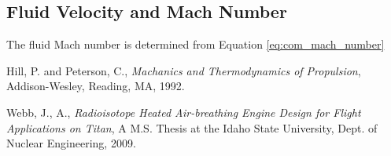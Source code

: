 \subsection{Fluid Velocity and Mach Number}
The fluid Mach number is determined from Equation \ref{eq:com_mach_number}

\begin{thebibliography}{2}

 Hill, P. and Peterson, C., \emph{Machanics and Thermodynamics of Propulsion}, Addison-Wesley, Reading, MA, 1992.

 Webb, J., A., \emph{Radioisotope Heated Air-breathing Engine Design for Flight Applications on Titan}, A M.S. Thesis at
                         the Idaho State University, Dept. of Nuclear Engineering, 2009.
\end{thebibliography}
